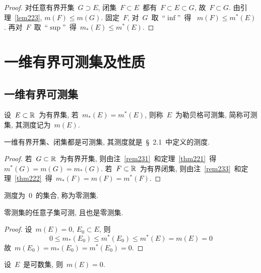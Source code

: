 \begin{proof}
对任意有界开集~$G \supset E$, 闭集~$F \subset E$~都有~$F \subset E \subset G$,
故~$F \subset G$. 由引理~\ref{lem223}, $m(F) \leqslant m(G)$. 固定~$F$, 对~$G$~取~``$\inf$''~得
~$m(F) \leqslant m^*(E)$. 再对~$F$~取~``$\sup$''~得~$m_*(E) \leqslant m^*(E)$.
\end{proof}



\section{一维有界可测集及性质}

\subsection{一维有界可测集}

\begin{definition}
设~$E \subset \mathbb{R}$~为有界集, 若~$m_*(E) = m^*(E)$, 则称~$E$~为勒贝格可测集, 简称可测集, 其测度记为~$m(E)$.
\end{definition}
\begin{remark}
一维有界开集、闭集都是可测集, 其测度就是~\S~2.1~中定义的测度.
\end{remark}

\begin{proof}
若~$G \subset \mathbb{R}$~为有界开集, 则由注~\ref{rem231}~和定理~\ref{thm221}~得~$m^*(G) = m(G) = m_*(G)$. 若~$F \subset \mathbb{R}$~为有界闭集,
则由注~\ref{rem233}~和定理~\ref{thm222}~得~$m_*(F) = m(F) = m^*(F)$.
\end{proof}

\begin{definition}
测度为~$0$~的集合, 称为零测集.
\end{definition}

\begin{theorem}
零测集的任意子集可测, 且也是零测集.
\end{theorem}

\begin{proof}
设~$m(E) = 0, \, E_0 \subset E$, 则
\[
0 \leqslant m_*(E_0) \leqslant m^*(E_0) \leqslant m^*(E) = m(E) = 0
\]
故~$m(E_0) = m_*(E_0) = m^*(E_0) = 0$.
\end{proof}

\medskip

\begin{example}
设~$E$~是可数集, 则~$m(E) = 0$.
\end{example}


